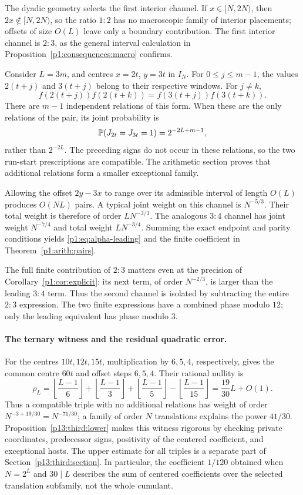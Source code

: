 The dyadic geometry selects the first interior channel.
If \(x\in[N,2N)\), then \(2x\notin[N,2N)\), so the
ratio \(1:2\) has no macroscopic family of interior placements;
offsets of size \(O(L)\) leave only a boundary contribution.
The first interior channel is \(2:3\), as the general interval
calculation in Proposition~\ref{p1:consequences:macro} confirms.

Consider \(L=3m\), and centres \(x=2t\), \(y=3t\) in \(I_N\).
For \(0\le j\le m-1\), the values \(2(t+j)\) and \(3(t+j)\)
belong to their respective windows. For \(j\ne k\),
\[
 f(2(t+j))f(2(t+k))
       =f(3(t+j))f(3(t+k)).
\]
There are \(m-1\) independent relations of this form. When these
are the only relations of the pair, its joint probability is
\[
 \P(J_{2t}=J_{3t}=1)=2^{-2L+m-1},
\]
rather than \(2^{-2L}\). The preceding signs do not occur in these
relations, so the two run-start prescriptions are compatible.
The arithmetic section proves that additional relations form a
smaller exceptional family.

Allowing the offset \(2y-3x\) to range over its admissible interval
of length \(O(L)\) produces \(O(NL)\) pairs. A typical joint weight
on this channel is \(N^{-5/3}\). Their total weight is therefore
of order \(L N^{-2/3}\). The analogous \(3:4\) channel has joint
weight \(N^{-7/4}\) and total weight \(L N^{-3/4}\).
Summing the exact endpoint and parity conditions yields
\eqref{p1:eq:alpha-leading} and the finite coefficient in
Theorem~\ref{p1:arith:pairs}.

The full finite contribution of \(2:3\) matters even at the precision
of Corollary~\ref{p1:cor:explicit}: its next term, of order \(N^{-2/3}\),
is larger than the leading \(3:4\) term. Thus the second channel
is isolated by subtracting the entire \(2:3\) expression.
The two finite expressions have a combined phase modulo \(12\);
only the leading equivalent has phase modulo \(3\).

\paragraph{The ternary witness and the residual quadratic error.}
For the centres \(10t,12t,15t\), multiplication by \(6,5,4\),
respectively, gives the common centre \(60t\) and offset steps
\(6,5,4\). Their rational nullity is
\[
 \rho_L=\left\lfloor\frac{L-1}{6}\right\rfloor
       +\left\lfloor\frac{L-1}{3}\right\rfloor
       +\left\lfloor\frac{L-1}{5}\right\rfloor
       -\left\lfloor\frac{L-1}{15}\right\rfloor
       =\frac{19}{30}L+O(1).
\]
Thus a compatible triple with no additional relations has weight
of order \(N^{-3+19/30}=N^{-71/30}\); a family of order \(N\)
translations explains the power \(41/30\).
Proposition~\ref{p13:third:lower} makes this witness rigorous by
checking private coordinates, predecessor signs, positivity of the
centered coefficient, and exceptional hosts. The upper estimate for
all triples is a separate part of Section~\ref{p13:third:section}.
In particular, the coefficient \(1/120\) obtained when \(N=2^L\)
and \(30\mid L\) describes the sum of centered coefficients over
the selected translation subfamily, not the whole cumulant.

